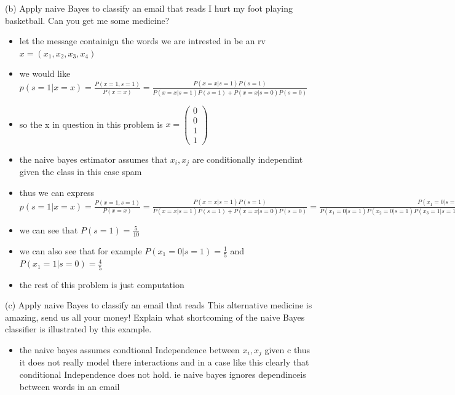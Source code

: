 \documentclass[10pt]{article}
\begin{document}
(b) Apply naive Bayes to classify an email that reads I hurt my foot playing basketball. Can you get me some medicine?
\begin{itemize}
    \item let the message containign the words we are intrested in be an rv $x=(x_1,x_2,x_3,x_4)$
    \item we would like $p(s=1|x=x)=\frac{P(x=1,s=1)}{P(x=x)}=\frac{P(x=x|s=1)P(s=1)}{P(x=x|s=1)P(s=1)+P(x=x|s=0)P(s=0)}$
    \item so the x in question in this problem is $x=\begin{pmatrix}
        0\\0\\1\\1
    \end{pmatrix}$
    \item the naive bayes estimator assumes that $x_i,x_j$ are conditionally independint given the class in this case spam 
    \item thus we can express $p(s=1|x=x)=\frac{P(x=1,s=1)}{P(x=x)}=\frac{P(x=x|s=1)P(s=1)}{P(x=x|s=1)P(s=1)+P(x=x|s=0)P(s=0)}=\frac{P(x_1=0|s=1)P(x_2=0|s=1)P(x_3=1|s=1)P(x_4=1|s=1)}{P(x_1=0|s=1)P(x_2=0|s=1)P(x_3=1|s=1)P(x_4=1|s=1)+P(x_1=0|s=0)P(x_2=0|s=0)P(x_3=1|s=0)P(x_4=1|s=0)}$
    \item we can see that $P(s=1)=\frac{5}{10}$ 
    \item we can also see that for example $P(x_1=0|s=1)=\frac{1}{5}$ and $P(x_1=1|s=0)=\frac{4}{5}$
    \item the rest of this problem is just computation 
\end{itemize}


(c) Apply naive Bayes to classify an email that reads This alternative medicine is amazing, send us all your money! Explain what shortcoming of the naive Bayes classifier is illustrated by this example.
\begin{itemize}
    \item the naive bayes assumes condtional Independence between $x_i,x_j$ given c thus it does not really model there interactions and in a case like this clearly that conditional Independence does not hold. ie naive bayes ignores dependinceis between words in an email 
\end{itemize}
\end{document}

